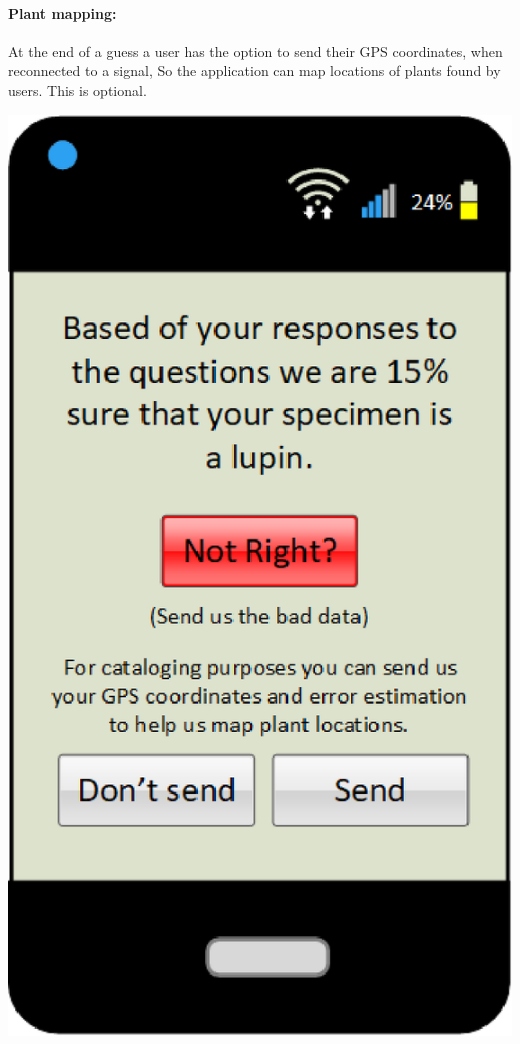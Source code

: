 \documentclass[a4paper]{article}
\begin{document}
\paragraph{Plant mapping:} At the end of a guess a user has the option to send their GPS coordinates, when reconnected to a signal, So the application can map locations of plants found by users. This is optional. 
\begin{center}\includegraphics[scale=.8]{FinalPageWithError.eps}\end{center}
\pagebreak
\end{document}
